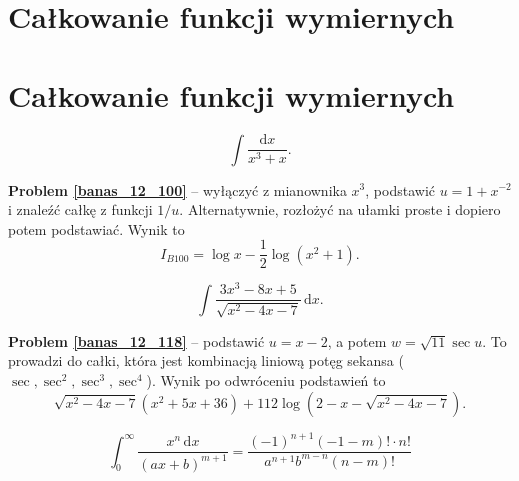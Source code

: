 %

\section{Całkowanie funkcji wymiernych}
\section{Całkowanie funkcji wymiernych}

\begin{problem_with_solution}
    \label{banas_12_100}%
\begin{equation}
    \int \frac{\mathrm{d}x}{x^3 + x}.
\end{equation}
\end{problem_with_solution}

\textbf{Problem \ref{banas_12_100}} -- wyłączyć z mianownika $x^3$, podstawić $u = 1 + x^{-2}$ i znaleźć całkę z funkcji $1/u$.
Alternatywnie, rozłożyć na ułamki proste i dopiero potem podstawiać.
Wynik to
\begin{equation}
    I_{B100} = \log x - \frac 12 \log (x^2 + 1).
\end{equation}

\begin{problem_with_solution}
    \label{banas_12_118}%
\begin{equation}
    \int \frac{3x^3 - 8x + 5}{\sqrt{x^2 - 4x - 7}} \,\mathrm{d}x.
\end{equation}
\end{problem_with_solution}

\textbf{Problem \ref{banas_12_118}} -- podstawić $u = x - 2$, a potem $w = \sqrt{11} \sec u$.
To prowadzi do całki, która jest kombinacją liniową potęg sekansa ($\sec, \sec^2, \sec^3, \sec^4$).
Wynik po odwróceniu podstawień to
\begin{equation}
    \sqrt{x^2 - 4x - 7} (x^2 + 5x + 36) + 112 \log \left(2 - x - \sqrt{x^2 - 4x-7}\right).
\end{equation}














\begin{problem}
\label{boros_4287}%
\begin{equation}
    \int_0^\infty \frac{x^n \,\mathrm{d}x}{(ax+b)^{m+1}}  = \frac{(-1)^{n+1} (-1-m)! \cdot n!}{a^{n+1} b^{m-n} (n-m)!}
\end{equation}
\end{problem}

